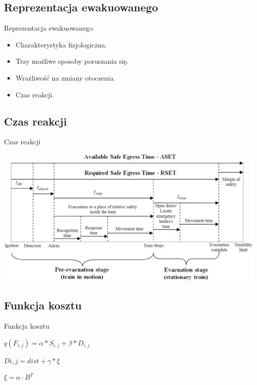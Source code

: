 \subsection{Reprezentacja ewakuowanego}
\begin{frame}{Reprezentacja ewakuowanego}
\begin{itemize}
	\item Charakterystyka fizjologiczna.
	\item Trzy możliwe sposoby poruszania się.
	\item Wrażliwość na zmiany otoczenia.
	\item Czas reakcji.
\end{itemize}
\end{frame}

\subsection{Czas reakcji}
\begin{frame}{Czas reakcji}
\begin{center}	
	\includegraphics[scale=0.9]{egress_time}
\end{center}
\end{frame}

\subsection{Funkcja kosztu}
\begin{frame}{Funkcja kosztu}
\begin{center}
$q(F_{i,j}) = \alpha * S_{i,j} + \beta * D_{i,j}$
\end{center}

\begin{center}
$D{i,j} = dist + \gamma * \xi$
\end{center}

\begin{center}
$\xi = \alpha \cdot B^T$
\end{center}
\end{frame}
